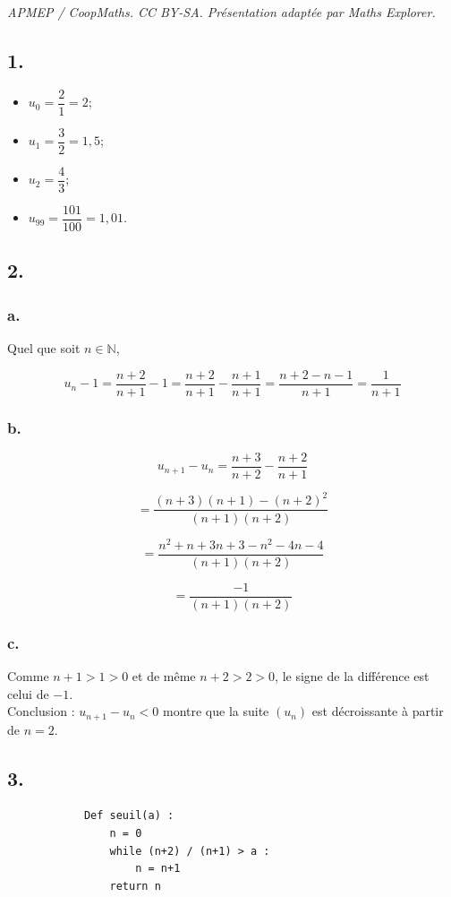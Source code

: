 \documentclass[10pt]{article}
\begin{document}
\noindent\textit{APMEP / CoopMaths. CC BY-SA. Présentation adaptée par Maths Explorer.}\par\medskip
\subsection*{1.}
	
	
	\begin{itemize}
		\item \(u_0 = \dfrac{2}{1} = 2\);
		\item \(u_1 = \dfrac{3}{2} = 1,5\);
		\item \(u_2 = \dfrac{4}{3}\);
		\item \(u_{99} = \dfrac{101}{100} = 1,01\).
	\end{itemize}
	
	\subsection*{2.}
	
	\subsubsection*{a.}
	

	Quel que soit \(n \in \mathbb{N}\),
	
	\[ u_n - 1 = \dfrac{n+2}{n+1} - 1 = \dfrac{n+2}{n+1} - \dfrac{n+1}{n+1} = \dfrac{n+2 - n - 1}{n+1} = \dfrac{1}{n+1} \]
	
	\subsubsection*{b.}
	

	
	\[ u_{n+1} - u_n = \dfrac{n+3}{n+2} - \dfrac{n+2}{n+1} \]
	
	\[ = \dfrac{(n+3)(n+1) - (n+2)^2}{(n+1)(n+2)} \]
	
	\[ = \dfrac{n^2 + n + 3n + 3 - n^2 - 4n - 4}{(n+1)(n+2)} \]
	
	\[ = \dfrac{-1}{(n+1)(n+2)} \]
	
	\subsubsection*{c.}
	

	Comme \(n+1 > 1 > 0\) et de même \(n+2 > 2 > 0\), le signe de la différence est celui de \(-1\).\\
	Conclusion : \(u_{n+1} - u_n < 0\) montre que la suite \((u_n)\) est décroissante à partir de \(n = 2\).
	
	\subsection*{3.}
\begin{center}
		\begin{minipage}{7cm}
		\begin{verbatim}
			Def seuil(a) :
				n = 0
				while (n+2) / (n+1) > a : 
					n = n+1
				return n 
		\end{verbatim}
	\end{minipage}
\end{center}
\end{document}

